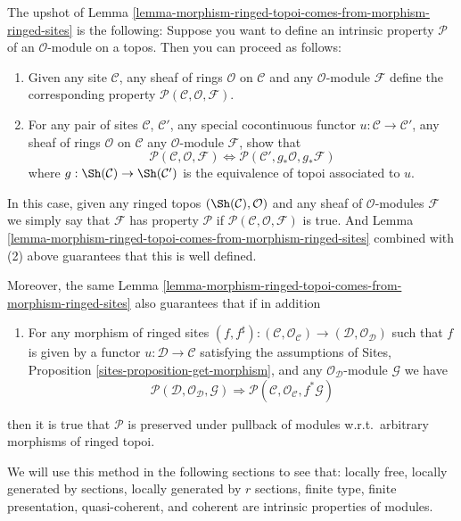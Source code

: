 \medskip\noindent
The upshot of
Lemma \ref{lemma-morphism-ringed-topoi-comes-from-morphism-ringed-sites}
is the following: Suppose you want to define
an intrinsic property $\mathcal{P}$ of an $\mathcal{O}$-module on a
topos. Then you can proceed as follows:
\begin{enumerate}
\item Given any site $\mathcal{C}$, any sheaf of rings $\mathcal{O}$
on $\mathcal{C}$ and any $\mathcal{O}$-module $\mathcal{F}$
define the corresponding
property $\mathcal{P}(\mathcal{C}, \mathcal{O}, \mathcal{F})$.
\item For any pair of sites $\mathcal{C}$, $\mathcal{C}'$, any
special cocontinuous functor $u : \mathcal{C} \to \mathcal{C}'$,
any sheaf of rings $\mathcal{O}$ on $\mathcal{C}$ any
$\mathcal{O}$-module $\mathcal{F}$, show that
$$
\mathcal{P}(\mathcal{C}, \mathcal{O}, \mathcal{F})
\Leftrightarrow
\mathcal{P}(\mathcal{C}', g_*\mathcal{O}, g_*\mathcal{F})
$$
where $g : \Sh(\mathcal{C}) \to \Sh(\mathcal{C}')$
is the equivalence of topoi associated to $u$.
\end{enumerate}
In this case, given any ringed topos $(\Sh(\mathcal{C}), \mathcal{O})$
and any sheaf of $\mathcal{O}$-modules $\mathcal{F}$ we simply say that
$\mathcal{F}$ has property $\mathcal{P}$ if
$\mathcal{P}(\mathcal{C}, \mathcal{O}, \mathcal{F})$ is true.
And Lemma \ref{lemma-morphism-ringed-topoi-comes-from-morphism-ringed-sites}
combined with (2) above guarantees that this is well defined.

\medskip\noindent
Moreover, the same
Lemma \ref{lemma-morphism-ringed-topoi-comes-from-morphism-ringed-sites}
also guarantees that if in addition
\begin{enumerate}
\item[(3)] For any morphism of ringed sites
$(f, f^\sharp) :
(\mathcal{C}, \mathcal{O}_\mathcal{C})
\to
(\mathcal{D}, \mathcal{O}_\mathcal{D})$
such that $f$ is given by a functor
$u : \mathcal{D} \to \mathcal{C}$ satisfying the
assumptions of Sites, Proposition \ref{sites-proposition-get-morphism},
and any $\mathcal{O}_\mathcal{D}$-module $\mathcal{G}$
we have
$$
\mathcal{P}(\mathcal{D}, \mathcal{O}_\mathcal{D}, \mathcal{G})
\Rightarrow
\mathcal{P}(\mathcal{C}, \mathcal{O}_\mathcal{C}, f^*\mathcal{G})
$$
\end{enumerate}
then it is true that $\mathcal{P}$ is preserved under pullback
of modules w.r.t.\ arbitrary morphisms of ringed topoi.

\medskip\noindent
We will use this method in the following sections to see
that:
locally free,
locally generated by sections,
locally generated by $r$ sections,
finite type,
finite presentation,
quasi-coherent, and
coherent
are intrinsic properties of modules.

